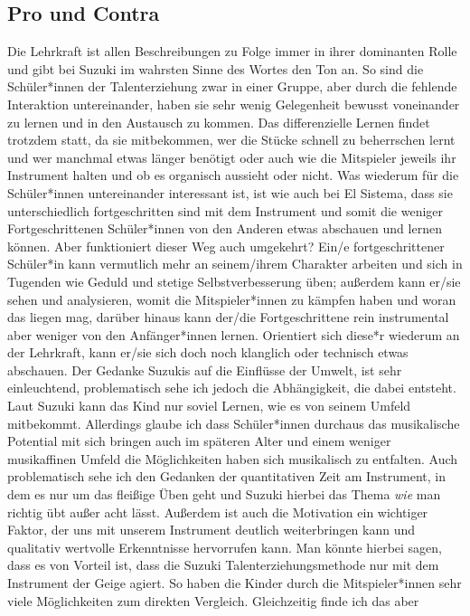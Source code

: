 \subsection{Pro und Contra}
Die Lehrkraft ist allen Beschreibungen zu Folge immer in ihrer dominanten Rolle
und gibt bei Suzuki im wahrsten Sinne des Wortes den Ton an. So sind die
Schüler*innen der Talenterziehung zwar in einer Gruppe, aber durch die fehlende
Interaktion untereinander, haben sie sehr wenig Gelegenheit bewusst voneinander
zu lernen und in den Austausch zu kommen. Das differenzielle Lernen findet
trotzdem statt, da sie mitbekommen, wer die Stücke schnell zu beherrschen lernt
und wer manchmal etwas länger benötigt oder auch wie die Mitspieler jeweils ihr
Instrument halten und ob es organisch aussieht oder nicht. Was wiederum für die
Schüler*innen untereinander interessant ist, ist wie auch bei El Sistema, dass
sie unterschiedlich fortgeschritten sind mit dem Instrument und somit die
weniger Fortgeschrittenen Schüler*innen von den Anderen etwas abschauen und
lernen können. Aber funktioniert dieser Weg auch umgekehrt? Ein/e
fortgeschrittener Schüler*in kann vermutlich mehr an seinem/ihrem Charakter
arbeiten und sich in Tugenden wie Geduld und stetige Selbstverbesserung üben;
außerdem kann er/sie sehen und analysieren, womit die Mitspieler*innen zu
kämpfen haben und woran das liegen mag, darüber hinaus kann der/die
Fortgeschrittene rein instrumental aber weniger von den Anfänger*innen lernen.
Orientiert sich diese*r wiederum an der Lehrkraft, kann er/sie sich doch noch
klanglich oder technisch etwas abschauen. Der Gedanke Suzukis auf die Einflüsse
der Umwelt, ist sehr einleuchtend, problematisch sehe ich jedoch die
Abhängigkeit, die dabei entsteht. Laut Suzuki kann das Kind nur soviel Lernen,
wie es von seinem Umfeld mitbekommt. Allerdings glaube ich dass Schüler*innen
durchaus das musikalische Potential mit sich bringen auch im späteren Alter und
einem weniger musikaffinen Umfeld die Möglichkeiten haben sich musikalisch zu
entfalten. Auch problematisch sehe ich den Gedanken der quantitativen Zeit am
Instrument, in dem es nur um das fleißige Üben geht und Suzuki hierbei das Thema
\emph{wie} man richtig übt außer acht lässt. Außerdem ist auch die Motivation
ein wichtiger Faktor, der uns mit unserem Instrument deutlich weiterbringen kann
und qualitativ wertvolle Erkenntnisse hervorrufen kann. Man könnte hierbei
sagen, dass es von Vorteil ist, dass die Suzuki Talenterziehungsmethode nur mit
dem Instrument der Geige agiert. So haben die Kinder durch die Mitspieler*innen
sehr viele Möglichkeiten zum direkten Vergleich. Gleichzeitig finde ich das aber
